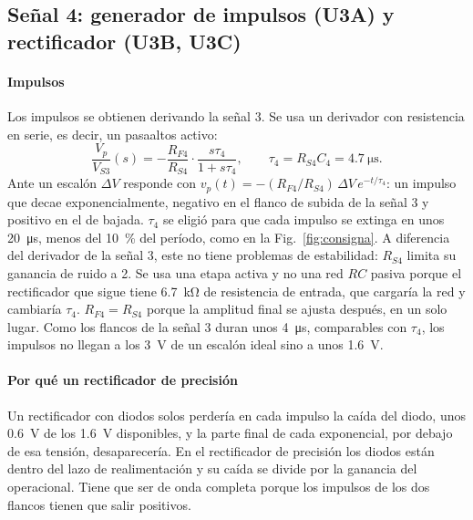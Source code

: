 \subsection{Señal 4: generador de impulsos (U3A) y rectificador (U3B, U3C)}
\label{sec:s4}
\paragraph*{Impulsos} Los impulsos se obtienen derivando la señal 3. Se usa un derivador con resistencia en serie, es decir, un pasaaltos activo:
\begin{equation}
\frac{V_p}{V_{S3}}(s) = -\frac{R_{F4}}{R_{S4}} \cdot \frac{s\tau_4}{1 + s\tau_4}, \qquad \tau_4 = R_{S4} C_4 = \SI{4,7}{\micro\second}.
\end{equation}
Ante un escalón $\Delta V$ responde con $v_p(t) = -(R_{F4}/R_{S4})\,\Delta V\, e^{-t/\tau_4}$: un impulso que decae exponencialmente, negativo en el flanco de subida de la señal 3 y positivo en el de bajada. $\tau_4$ se eligió para que cada impulso se extinga en unos \SI{20}{\micro\second}, menos del \SI{10}{\percent} del período, como en la Fig.~\ref{fig:consigna}. A diferencia del derivador de la señal 3, este no tiene problemas de estabilidad: $R_{S4}$ limita su ganancia de ruido a 2. Se usa una etapa activa y no una red $RC$ pasiva porque el rectificador que sigue tiene \SI{6,7}{\kilo\ohm} de resistencia de entrada, que cargaría la red y cambiaría $\tau_4$. $R_{F4} = R_{S4}$ porque la amplitud final se ajusta después, en un solo lugar. Como los flancos de la señal 3 duran unos \SI{4}{\micro\second}, comparables con $\tau_4$, los impulsos no llegan a los \SI{3}{\volt} de un escalón ideal sino a unos \SI{1,6}{\volt}.

\paragraph*{Por qué un rectificador de precisión} Un rectificador con diodos solos perdería en cada impulso la caída del diodo, unos \SI{0,6}{\volt} de los \SI{1,6}{\volt} disponibles, y la parte final de cada exponencial, por debajo de esa tensión, desaparecería. En el rectificador de precisión los diodos están dentro del lazo de realimentación y su caída se divide por la ganancia del operacional. Tiene que ser de onda completa porque los impulsos de los dos flancos tienen que salir positivos.

